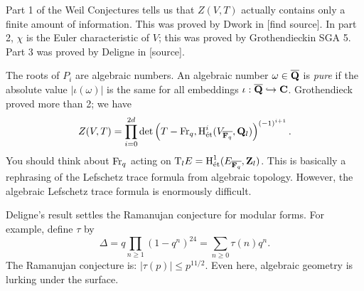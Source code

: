 Part 1 of the Weil Conjectures tells us that $Z(V,T)$ actually contains only a 
finite amount of information. This was proved by Dwork in [find source]. In 
part 2, $\chi$ is the Euler characteristic of $V$; this was proved by 
Grothendieckin SGA 5. Part 3 was proved by Deligne in [source]. 

The roots of $P_i$ are algebraic numbers. An algebraic number 
$\omega\in \overline{\mathbf{Q}}$ is \emph{pure} if the absolute value 
$|\iota(\omega)|$ is the same for all embeddings 
$\iota:\overline{\mathbf{Q}}\hookrightarrow \mathbf{C}$. Grothendieck proved more than 2; we have 
\[
  Z(V,T) = \prod_{i=0}^{2 d} \det\left(T-\operatorname{Fr}_q,\operatorname{H}_{\textnormal{\'et}}^i(V_{\overline{\mathbf{F}_q}},\mathbf{Q}_l)\right)^{(-1)^{i+1}} .
\]
You should think about $\operatorname{Fr}_q$ acting on 
$\mathrm{T}_l E = \operatorname{H}_{\textnormal{\'et}}^1(E_{\overline{\mathbf{F}_q}},\mathbf{Z}_l)$. This is basically 
a rephrasing of the Lefschetz trace formula from algebraic topology. However, 
the algebraic Lefschetz trace formula is enormously difficult. 

Deligne's result settles the Ramanujan conjecture for modular forms. For 
example, define $\tau$ by 
\[
  \Delta=q \prod_{n\geqslant 1} (1-q^n)^{24} = \sum_{n\geqslant 0} \tau(n) q^n .
\]
The Ramanujan conjecture is: $|\tau(p)|\leqslant p^{11/2}$. Even here, 
algebraic geometry is lurking under the surface. 




